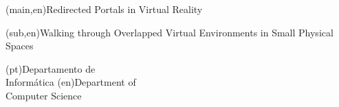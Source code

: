 
%


\nttitle(main,en){Redirected Portals in Virtual Reality}%

\nttitle(sub,en){Walking through Overlapped Virtual Environments in Small Physical Spaces}%


\ntdepartment*(pt){Departamento de\\Informática}
\ntdepartment*(en){Department of\\Computer Science}


